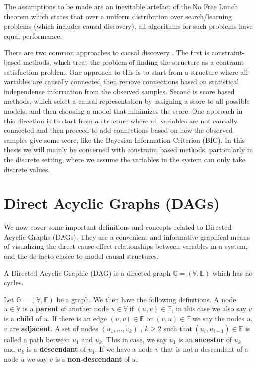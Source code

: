 \documentclass{tufte-book}
\begin{document}
The assumptions to be made are an inevitable artefact of the No Free Lunch theorem \cite{wolpert-2020-what-no} which states that over a uniform distribution over search/learning problems (which includes causal discovery), all algorithms for such problems have equal performance.

There are two common approaches to causal discovery \cite{glymour-2019-review-causal}. The first is constraint-based methods, which treat the problem of finding the structure as a contraint satisfaction problem. One approach to this is to start from a structure where all variables are causally connected then remove connections based on statistical independence information from the observed samples. Second is score based methods, which select a causal representation by assigning a score to all possible models, and then choosing a model that minimizes the score. One approach in this direction is to start from a structure where all variables are not causally connected and then proceed to add connections based on how the observed samples give some score, like the Bayesian Information Criterion (BIC). In this thesis we will mainly be concerned with constraint based methods, particularly in the discrete setting, where we assume the variables in the system can only take discrete values.  



\section{Direct Acyclic Graphs (DAGs)}
\label{sec:orgffa80a6}
We now cover some important definitions and concepts related to Directed Acyclic Graphs (DAGs). They are a convenient and informative graphical means of visualizing the direct cause-effect relationships between variables in a system, and the de-facto choice to model causal structures.



\begin{definition}[DAGs]\label{dagdef}
    A Directed Acyclic Graphic (DAG) is a directed graph $\mathbb{G} = (\mathbb{V},\mathbb{E})$ which has no cycles.
\end{definition}

Let $\mathbb{G} = (\mathbb{V},\mathbb{E})$ be a graph. We then have the following definitions. A node $u \in \mathbb{V}$ is a \textbf{parent} of another node $u \in \mathbb{V}$ if $(u,v) \in \mathbb{E}$, in this case we also say $v$ is a \textbf{child} of $u$. If there is an edge $(u,v) \in \mathbb{E}$ or $(v,u)\in \mathbb{E}$ we say the nodes $u$,$v$ are \textbf{adjacent}. A set of nodes $(u_1,...,u_k)$ , $k\geq 2$ such that $(u_i,u_{i+1}) \in \mathbb{E}$ is called a path between $u_1$ and $u_k$. This in case, we say $u_1$ is an \textbf{ancestor} of $u_k$ and $u_k$ is a \textbf{descendant} of $u_1$. If we have a node $v$ that is not a descendant of a node $u$ we say $v$ is a \textbf{non-descendant} of $u$.
\end{document}

